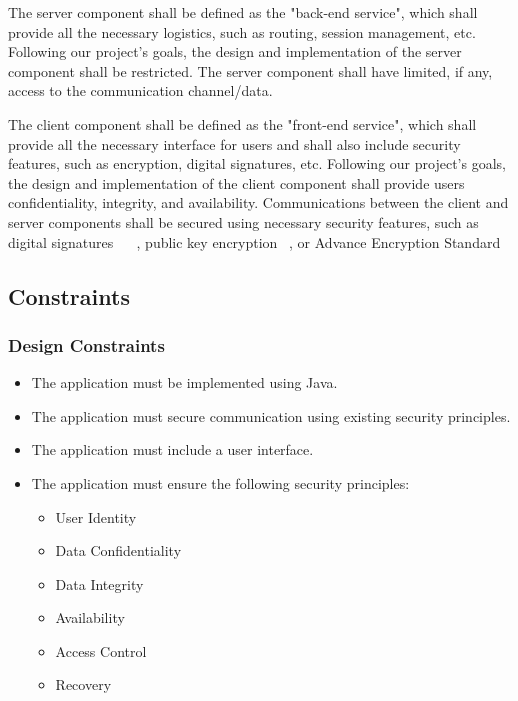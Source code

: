 \documentclass[sigconf]{acmart}
\begin{document}
The server component shall be defined as the "back-end service", which shall provide all the
necessary logistics, such as routing, session management, etc. Following our project's goals, the
design and implementation of the server component shall be restricted. The server component shall
have limited, if any, access to the communication channel/data.

The client component shall be defined as the "front-end service", which shall provide all the
necessary interface for users and shall also include security features, such as encryption, digital
signatures, etc. Following our project's goals, the design and implementation of the client
component shall provide users confidentiality, integrity, and availability. Communications between
the client and server components shall be secured using necessary security features, such as
digital signatures ~\cite{Fersch:provable} ~\cite{Meijer:signature}, public key encryption
~\cite{Kuchlin:publickey}, or Advance Encryption Standard ~\cite{Jariwala:taxonomy}

\subsection{Constraints}

\subsubsection{Design Constraints}
\begin{itemize}
 \item The application must be implemented using Java.
 \item The application must secure communication using existing security principles.
 \item The application must include a user interface.
 \item The application must ensure the following security principles:
       \begin{itemize}
        \item User Identity
        \item Data Confidentiality
        \item Data Integrity
        \item Availability
        \item Access Control
        \item Recovery
       \end{itemize}
\end{itemize}
\end{document}
